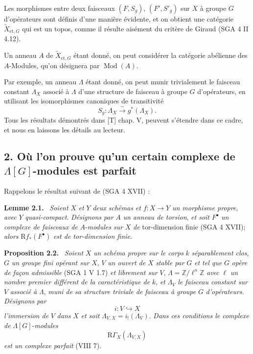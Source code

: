 \documentclass[11pt]{article}
\newenvironment{statement}[1]{\par\medskip\noindent\textbf{#1.}\ }{\par\medskip}
\newcommand{\R}{\mathrm{R}}\newcommand{\RHomCore}{\mathrm{RHom}}
\providecommand{\R}{\mathrm R}
\providecommand{\Mod}{\operatorname{Mod}}
\begin{document}
Les morphismes entre deux faisceaux $(F,S_g)$, $(F',S'_g)$ sur $X$ à groupe $G$ d'opérateurs sont définis d'une manière évidente, et on obtient une catégorie $\widetilde X_{\mathrm{et},G}$ qui est un topos, comme il résulte aisément du critère de Giraud (SGA 4 II 4.12).

Un anneau $A$ de $\widetilde X_{\mathrm{et},G}$ étant donné, on peut considérer la catégorie abélienne des $A$-Modules, qu'on désignera par $\Mod(A)$.

Par exemple, un anneau $\Lambda$ étant donné, on peut munir trivialement le faisceau constant $\Lambda_X$ associé à $\Lambda$ d'une structure de faisceau à groupe $G$ d'opérateurs, en utilisant les isomorphismes canoniques de transitivité
\[
S_g:\Lambda_X\xrightarrow{\sim}g^*(\Lambda_X).
\]
Tous les résultats démontrés dans [T] chap. V, peuvent s'étendre dans ce cadre, et nous en laissons les détails au lecteur.

\subsection*{2. Où l'on prouve qu'un certain complexe de $\Lambda[G]$-modules est parfait}

Rappelons le résultat suivant de (SGA 4 XVII) :

\begin{statement}{Lemme 2.1}
\emph{Soient} $X$ \emph{et} $Y$ \emph{deux schémas et} $f:X\to Y$ \emph{un morphisme propre}, \emph{avec} $Y$ \emph{quasi-compact}. \emph{Désignons par} $A$ \emph{un anneau de torsion}, \emph{et soit} $F^\bullet$ \emph{un complexe de faisceaux de} $A$-\emph{modules sur} $X$ \emph{de} tor-dimension finie (SGA 4 XVII); \emph{alors} $\R f_*(F^\bullet)$ \emph{est de tor-dimension finie}.
\end{statement}

\begin{statement}{Proposition 2.2}
\emph{Soient} $X$ \emph{un schéma propre sur le corps} $k$ \emph{séparablement clos}, $G$ \emph{un groupe fini opérant sur} $X$, $V$ \emph{un ouvert de} $X$ \emph{stable par} $G$ \emph{et tel que} $G$ \emph{opère de façon admissible} (SGA 1 V 1.7) \emph{et librement sur} $V$, $\Lambda=\mathbb Z/\ell^n\mathbb Z$ \emph{avec} $\ell$ \emph{un nombre premier différent de la caractéristique de} $k$, \emph{et} $\Lambda_V$ \emph{le faisceau constant sur} $V$ \emph{associé à} $\Lambda$, \emph{muni de sa structure triviale de faisceau à groupe} $G$ \emph{d'opérateurs}. \emph{Désignons par}
\[
i:V\hookrightarrow X
\]
\emph{l'immersion de} $V$ \emph{dans} $X$ \emph{et soit} $\Lambda_{V,X}=i_!(\Lambda_V)$. \emph{Dans ces conditions le complexe de} $\Lambda[G]$-\emph{modules}
\[
\R\Gamma_X(\Lambda_{V,X})
\]
\emph{est un complexe parfait} (VIII 7).
\end{statement}
\end{document}
